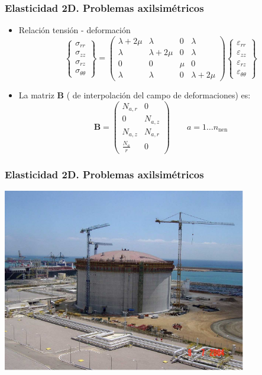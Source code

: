 \documentclass{beamer}
\begin{document}
\begin{frame}
\frametitle{Elasticidad 2D. Problemas axilsimétricos}
\begin{itemize}
\item Relación tensión - deformación
\begin{equation}
\left\{
\begin{array}{c}
\sigma_{rr} \\
\sigma_{zz} \\
\sigma_{rz} \\
\sigma_{\theta \theta}
\end{array}
\right\}=
\left(
\begin{array}{cccc}
\lambda+2\mu & \lambda     & 0 & \lambda \\
\lambda     & \lambda+2\mu & 0 & \lambda \\
0           & 0       & \mu& 0 \\
\lambda     & \lambda & 0 & \lambda+2\mu
\end{array}
\right)
\left\{
\begin{array}{c}
\varepsilon_{rr} \\
\varepsilon_{zz} \\
\varepsilon_{rz} \\
\varepsilon_{\theta \theta}
\end{array}
\right\}
\end{equation}
\item La matriz $\mathbf{B}$ ( de interpolación del campo de deformaciones)
es:
\begin{equation}
\mathbf{B}=
\left(
\begin{array}{cc}
N_{a,r} & 0       \\
0       & N_{a,z} \\
N_{a,z} & N_{a,r} \\
\frac{N_a}{r}&0
\end{array}
\right) \qquad a=1 \ldots n_{\textrm{nen}}
\end{equation}
\end{itemize}
\end{frame}
\begin{frame}
\frametitle{Elasticidad 2D. Problemas axilsimétricos}
\begin{center}
\includegraphics[width=0.8\textwidth]{tn_lng_tank2}
\end{center}
\end{frame}
\end{document}
